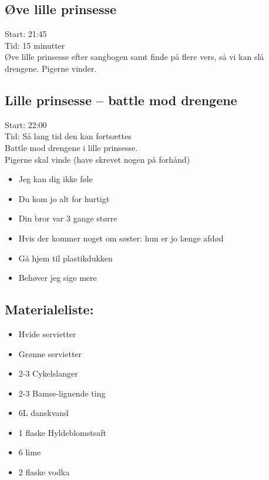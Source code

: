 \subsection*{Øve lille prinsesse}
Start: 21:45 \\
Tid: 15 minutter \\
Øve lille prinsesse efter sangbogen samt finde på flere vers, så vi kan slå drengene. Pigerne vinder.

\subsection*{Lille prinsesse – battle mod drengene}
Start: 22:00 \\
Tid: Så lang tid den kan fortsættes \\
Battle mod drengene i lille prinsesse. \\
Pigerne skal vinde (have skrevet nogen på forhånd)
\begin{itemize}
  \item Jeg kan dig ikke føle
  \item Du kom jo alt for hurtigt
  \item Din bror var 3 gange større
  \item Hvis der kommer noget om søster: hun er jo længe afdød
  \item Gå hjem til plastikdukken
  \item Behøver jeg sige mere
\end{itemize}

\subsection*{Materialeliste:}
\begin{itemize}
  \item Hvide servietter
  \item Grønne servietter
  \item 2-3 Cykelslanger
  \item 2-3 Bamse-lignende ting
  \item 6L danskvand
  \item 1 flaske Hyldeblomstsaft
  \item 6 lime
  \item 2 flaske vodka
\end{itemize}

\pagebreak

\pagebreak
